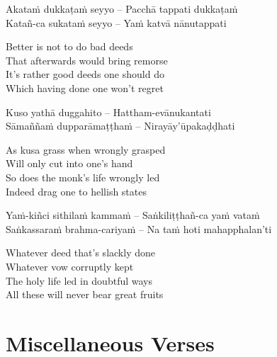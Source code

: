 \begin{verses}
  Akataṁ dukkaṭaṁ seyyo – Pacchā tappati dukkaṭaṁ\\
  Katañ-ca sukataṁ seyyo – Yaṁ katvā nānutappati
\end{verses}

\begin{english-verses}
  Better is not to do bad deeds\\
  That afterwards would bring remorse\\
  It's rather good deeds one should do\\
  Which having done one won't regret
\end{english-verses}

\begin{verses}
  Kuso yathā duggahito – Hattham-evānukantati\\
  Sāmaññaṁ dupparāmaṭṭhaṁ – Nirayāy'ūpakaḍḍhati
\end{verses}

\begin{english-verses}
  As kusa grass when wrongly grasped\\
  Will only cut into one's hand\\
  So does the monk's life wrongly led\\
  Indeed drag one to hellish states
\end{english-verses}

\begin{verses}
  Yaṁ-kiñci sithilaṁ kammaṁ – Saṅkiliṭṭhañ-ca yaṁ vataṁ\\
  Saṅkassaraṁ brahma-cariyaṁ – Na taṁ hoti mahapphalan'ti
\end{verses}

\begin{english-verses}
  Whatever deed that's slackly done\\
  Whatever vow corruptly kept\\
  The holy life led in doubtful ways\\
  All these will never bear great fruits
\end{english-verses}

\suttaRef{[SN 2.8]}


\section{Miscellaneous Verses}
\label{misc-verses}

